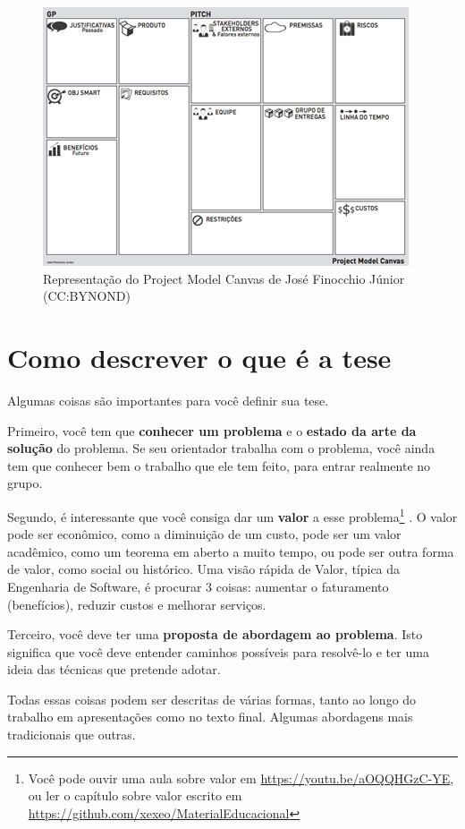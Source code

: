 \begin{figure}
    \centering
    \includegraphics[width=0.7\linewidth]{Images/PMC}
    \caption{Representação do Project Model Canvas de José Finocchio Júnior (CC:BYNOND)}
    \label{fig:pmc}
\end{figure}


   \section{Como descrever o que é a tese}

Algumas coisas são importantes para você definir sua tese.

Primeiro, você tem que \textbf{conhecer um problema} e o \textbf{estado da arte da solução} do problema. Se seu orientador trabalha com o problema, você ainda tem que conhecer bem o trabalho que ele tem feito, para entrar realmente no grupo.

Segundo, é interessante que você consiga dar um \textbf{valor} a esse problema\footnote{Você pode ouvir uma aula sobre valor em \url{https://youtu.be/aOQQHGzC-YE}, ou ler o capítulo sobre valor escrito em \url{https://github.com/xexeo/MaterialEducacional}} . O valor pode ser econômico, como a diminuição de um custo, pode ser um valor acadêmico, como um teorema em aberto a muito tempo, ou pode ser outra forma de valor, como social ou histórico. Uma visão rápida de Valor, típica da Engenharia de Software, é procurar 3 coisas: aumentar o faturamento (benefícios), reduzir custos e melhorar serviços.

Terceiro, você deve ter uma \textbf{proposta de abordagem ao problema}. Isto significa que você deve entender caminhos possíveis para resolvê-lo e ter uma ideia das técnicas que pretende adotar.

Todas essas coisas podem ser descritas de várias formas, tanto ao longo do trabalho em apresentações como no texto final. Algumas abordagens mais tradicionais que outras.

